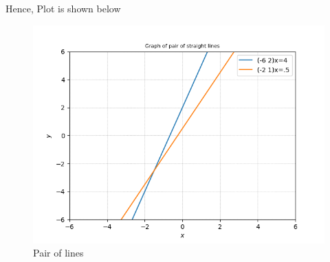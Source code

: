 Hence, Plot is shown below 
\begin{figure}[ht!]
\centering
\includegraphics[width=\columnwidth]{./solutions/13/7/Figure.png}
\caption{Pair of lines}
\end{figure}
